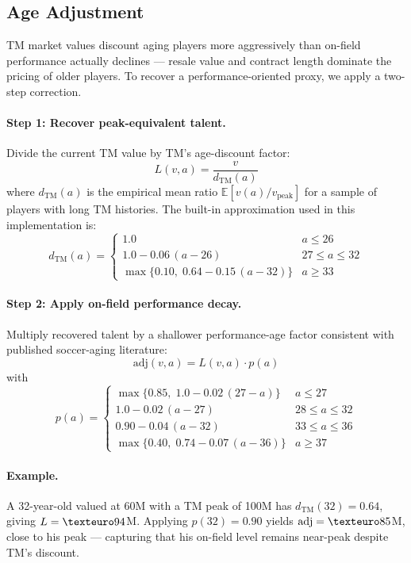 \documentclass[11pt]{article}
\begin{document}
\subsection{Age Adjustment}

TM market values discount aging players more aggressively than on-field performance actually declines --- resale value and contract length dominate the pricing of older players. To recover a performance-oriented proxy, we apply a two-step correction.

\paragraph{Step 1: Recover peak-equivalent talent.} Divide the current TM value by TM's age-discount factor:
\begin{equation}
L(v, a) = \frac{v}{d_{\text{TM}}(a)}
\label{eq:age_step1}
\end{equation}
where $d_{\text{TM}}(a)$ is the empirical mean ratio $\mathbb{E}[v(a) / v_{\text{peak}}]$ for a sample of players with long TM histories. The built-in approximation used in this implementation is:
\[
d_{\text{TM}}(a) = \begin{cases}
1.0 & a \leq 26 \\
1.0 - 0.06\,(a - 26) & 27 \leq a \leq 32 \\
\max\{0.10,\; 0.64 - 0.15\,(a - 32)\} & a \geq 33
\end{cases}
\]

\paragraph{Step 2: Apply on-field performance decay.} Multiply recovered talent by a shallower performance-age factor consistent with published soccer-aging literature:
\begin{equation}
\text{adj}(v, a) = L(v, a) \cdot p(a)
\label{eq:age_step2}
\end{equation}
with
\[
p(a) = \begin{cases}
\max\{0.85,\; 1.0 - 0.02\,(27 - a)\} & a \leq 27 \\
1.0 - 0.02\,(a - 27) & 28 \leq a \leq 32 \\
0.90 - 0.04\,(a - 32) & 33 \leq a \leq 36 \\
\max\{0.40,\; 0.74 - 0.07\,(a - 36)\} & a \geq 37
\end{cases}
\]

\paragraph{Example.} A 32-year-old valued at \texteuro 60M with a TM peak of \texteuro 100M has $d_{\text{TM}}(32) = 0.64$, giving $L = \texteuro 94$M. Applying $p(32) = 0.90$ yields $\text{adj} = \texteuro 85$M, close to his peak --- capturing that his on-field level remains near-peak despite TM's discount.
\end{document}

